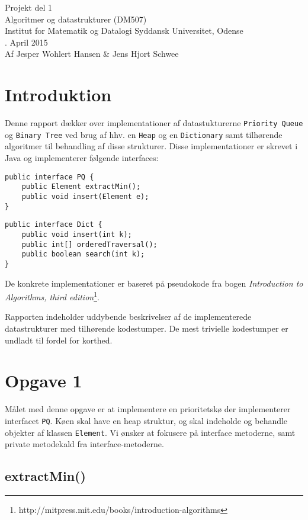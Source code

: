 \documentclass{article}
\begin{document}
{\centering
\huge
Projekt del 1\\
Algoritmer og datastrukturer (DM507)\\
\large
\bigskip
Institut for Matematik og Datalogi Syddansk Universitet, Odense\\
. April 2015\\
\bigskip
Af Jesper Wohlert Hansen \& Jens Hjort Schwee\\
}
\newpage

\section*{Introduktion}
Denne rapport dækker over implementationer af datastukturerne \texttt{Priority Queue} og \texttt{Binary Tree} ved brug af hhv. en \texttt{Heap} og en \texttt{Dictionary} samt tilhørende algoritmer til behandling af disse strukturer. Disse implementationer er skrevet i Java og implementerer følgende interfaces:

\begin{verbatim}
public interface PQ {
    public Element extractMin();
    public void insert(Element e);
}
\end{verbatim}


\begin{verbatim}
public interface Dict {
    public void insert(int k);
    public int[] orderedTraversal();
    public boolean search(int k);
}
\end{verbatim}

De konkrete implementationer er baseret på pseudokode fra bogen \emph{Introduction to Algorithms, third edition}\footnote{http://mitpress.mit.edu/books/introduction-algorithms}.


Rapporten indeholder uddybende beskrivelser af de implementerede datastrukturer med tilhørende kodestumper. De mest trivielle kodestumper er undladt til fordel for korthed.

\newpage

\section*{Opgave 1}
Målet med denne opgave er at implementere en prioritetskø der implementerer interfacet \texttt{PQ}. Køen skal have en heap struktur, og skal indeholde og behandle objekter af klassen \texttt{Element}. Vi ønsker at fokusere på interface metoderne, samt private metodekald fra interface-metoderne.

\subsection*{extractMin()}
\end{document}
